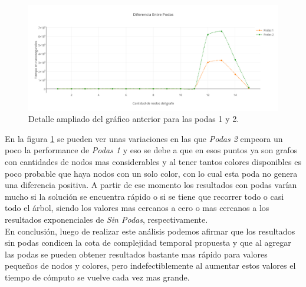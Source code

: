  \begin{figure}[H]
	\centering
 	\includegraphics[scale=0.45]{imagenes/ej2/NodosPodas.png}
	\caption{Detalle ampliado del gráfico anterior para las podas 1 y 2.}
	\label{nodosP}
 \end{figure} 

 En la figura \ref{nodosP} se pueden ver unas variaciones en las que \emph{Podas 2} empeora un poco la performance de \emph{Podas 1} y eso se debe a que en esos puntos ya son grafos con cantidades de nodos mas considerables y al tener tantos colores disponibles es poco probable que haya nodos con un solo color, con lo cual esta poda no genera una diferencia positiva. A partir de ese momento los resultados con podas varían mucho si la solución se encuentra rápido o si se tiene que recorrer todo o casi todo el árbol, siendo los valores mas cercanos a cero o mas cercanos a los resultados exponenciales de \emph{Sin Podas}, respectivamente.\\

 En conclusión, luego de realizar este análisis podemos afirmar que los resultados sin podas condicen la cota de complejidad temporal propuesta y que al agregar las podas se pueden obtener resultados bastante mas rápido para valores pequeños de nodos y colores, pero indefectiblemente al aumentar estos valores el tiempo de cómputo se vuelve cada vez mas grande.